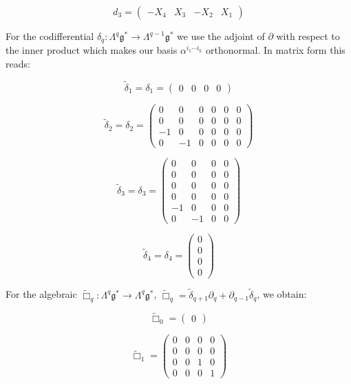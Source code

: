 \documentclass[reqno,12pt]{amsart}
\newcommand\goe{\mathfrak g}
\theoremstyle{plain}
\theoremstyle{definition}
\begin{document}
$$
d_3=\left(\begin{array}{c|c|cc}
-X_4&X_3&-X_2&X_1
\end{array}\right)
$$

For the codifferential $\delta_q\colon\Lambda^q\goe^*\to\Lambda^{q-1}\goe^*$ we use the adjoint of $\partial$ with respect to the inner product which makes our basis $\alpha^{i_1\cdots i_k}$ orthonormal. 
In matrix form this reads:

$$
\tilde\delta_1=\delta_1=\left(\begin{array}{cc|c|c}
0&0&0&0
\end{array}\right)
$$

$$
\tilde\delta_2=\delta_2=\left(\begin{array}{c|cc|cc|c}
0&0&0&0&0&0\\
0&0&0&0&0&0\\\hline
-1&0&0&0&0&0\\\hline
0&-1&0&0&0&0
\end{array}\right)
$$

$$
\tilde\delta_3=\delta_3=\left(\begin{array}{c|c|cc}
0&0&0&0\\\hline
0&0&0&0\\
0&0&0&0\\\hline
0&0&0&0\\
-1&0&0&0\\\hline
0&-1&0&0
\end{array}\right)
$$

$$
\tilde\delta_4=\delta_4=\left(\begin{array}{c}
0\\\hline
0\\\hline
0\\
0
\end{array}\right)
$$

For the algebraic $\tilde\Box_q\colon\Lambda^q\goe^*\to\Lambda^q\goe^*$, $\tilde\Box_q=\tilde\delta_{q+1}\partial_q+\partial_{q-1}\tilde\delta_q$, we obtain:

$$
\tilde\Box_0=\left(\begin{array}{c}
0
\end{array}\right)
$$

$$
\tilde\Box_1=\left(\begin{array}{cc|c|c}
0&0&0&0\\
0&0&0&0\\\hline
0&0&1&0\\\hline
0&0&0&1
\end{array}\right)
$$
\end{document}
